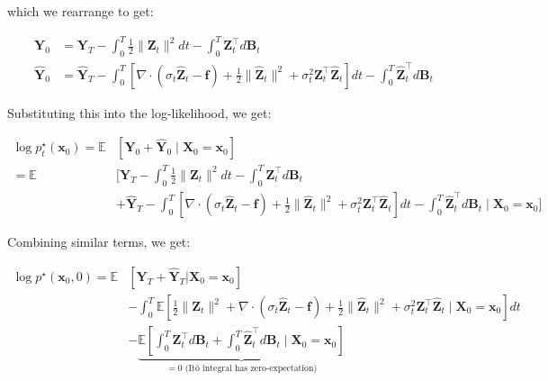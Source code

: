 \documentclass{article}
\begin{document}
which we rearrange to get:
\begin{small}
\begin{align}
    \boldsymbol{Y}_0&=\boldsymbol{Y}_T-\int_0^T \frac{1}{2}\|\boldsymbol{Z}_t\|^2dt-\int_0^T\boldsymbol{Z}_t^\top d \boldsymbol{B}_t\\
    \widehat{\boldsymbol{Y}}_0&=\widehat{\boldsymbol{Y}}_T-\int_0^T\left[\nabla\cdot (\sigma_t\widehat{\boldsymbol{Z}}_t-\boldsymbol{f})+\frac{1}{2}\|\widehat{\boldsymbol{Z}}_t\|^2+ \sigma_t^2\boldsymbol{Z}_t^\top \widehat{\boldsymbol{Z}}_t\right]dt-\int_0^T\widehat{\boldsymbol{Z}}_t^\top d \boldsymbol{B}_t
\end{align}
\end{small}
Substituting this into the log-likelihood, we get:
\begin{small}
\begin{align}
    \log p^\star_t(\boldsymbol{x}_0)=\mathbb{E}&\left[\boldsymbol{Y}_0+\widehat{\boldsymbol{Y}}_0\;\big|\;\boldsymbol{X}_0=\boldsymbol{x}_0\right]\nonumber\\
    =\mathbb{E}&\bigg[\boldsymbol{Y}_T-\int_0^T \frac{1}{2}\|\boldsymbol{Z}_t\|^2dt-\int_0^T\boldsymbol{Z}_t^\top d \boldsymbol{B}_t\nonumber\\
    &+\widehat{\boldsymbol{Y}}_T-\int_0^T\left[\nabla\cdot (\sigma_t\widehat{\boldsymbol{Z}}_t-\boldsymbol{f})+\frac{1}{2}\|\widehat{\boldsymbol{Z}}_t\|^2+ \sigma_t^2\boldsymbol{Z}_t^\top \widehat{\boldsymbol{Z}}_t\right]dt-\int_0^T\widehat{\boldsymbol{Z}}_t^\top d \boldsymbol{B}_t\;\bigg|\;\boldsymbol{X}_0=\boldsymbol{x}_0\bigg]
\end{align}
\end{small}
Combining similar terms, we get:
\begin{small}
\begin{align}
    \log p^\star(\boldsymbol{x}_0,0)=\mathbb{E}&\left[\boldsymbol{Y}_T+\widehat{\boldsymbol{Y}}_T\big|\boldsymbol{X}_0=\boldsymbol{x}_0\right]\nonumber\\
    &-\int_0^T\mathbb{E}\left[\frac{1}{2}\|\boldsymbol{Z}_t\|^2+\nabla\cdot (\sigma_t\widehat{\boldsymbol{Z}}_t-\boldsymbol{f})+\frac{1}{2}\|\widehat{\boldsymbol{Z}}_t\|^2+ \sigma_t^2\boldsymbol{Z}_t^\top \widehat{\boldsymbol{Z}}_t\;\bigg|\;\boldsymbol{X}_0=\boldsymbol{x}_0\right]dt\nonumber\\
    &-\underbrace{\mathbb{E}\left[\int_0^T\boldsymbol{Z}_t^\top d \boldsymbol{B}_t+\int_0^T\widehat{\boldsymbol{Z}}_t^\top d \boldsymbol{B}_t\;\bigg|\;\boldsymbol{X}_0=\boldsymbol{x}_0\right]}_{=0\text{ (Itô integral has zero-expectation)}}
\end{align}
\end{small}
\end{document}
